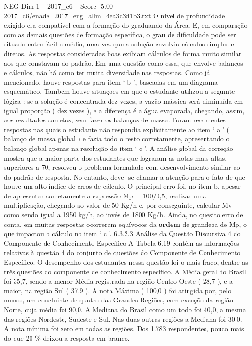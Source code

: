\begin{textsample}{NEG Dim 1 – 2017\_c6 – Score -5.00 – 2017\_c6/enade\_2017\_eng\_alim\_4ea3c3d1b3.txt}
O nível de profundidade exigido era compatível com a formação do graduando da Área.
E, em comparação com as demais questões de formação específica, o grau de dificuldade pode ser situado entre fácil e médio, uma vez que a solução envolvia cálculos simples e diretos.
As respostas consideradas boas exibiam cálculos de forma muito similar aos que constavam do padrão.
Em uma questão como essa, que envolve balanços e cálculos, não há como ter muita diversidade nas respostas.
Como já mencionado, houve respostas para item ‘ b ’, baseadas em um diagrama esquemático.
Também houve situações em que o estudante utilizou a seguinte lógica : se a solução é concentrada dez vezes, a vazão mássica será diminuída em igual proporção ( dez vezes ), e a diferença é a água evaporada, chegando, assim, aos resultados corretos, sem fazer os balanços de massa.
Foram recorrentes respostas nas quais o estudante não respondia explicitamente ao item ‘ a ’ ( balanço de massa global ) e fazia todo o resto corretamente, apresentando o balanço global apenas na resolução do item ‘ c ’.
A análise global da correção mostra que a maior parte dos estudantes que lograram as notas mais altas, superiores a 70, resolveu o problema formulado com desenvolvimento similar ao do padrão de resposta.
No entanto, deve -se chamar a atenção para o fato de que houve um alto índice de erros de cálculo.
O principal erro foi, no item b, apesar de apresentar corretamente a expressão Mp = 100/0,5, realizar uma multiplicação, chegando ao valor de 50 Kg/h e, por conseguinte, calcular Mv como sendo igual a 1950 kg/h, ao invés de 1800 Kg/h.
Ainda, no quesito erro de conta, em muitas respostas ocorreram equívocos da \textbf{ordem} de grandeza de Mp, o que impactou o cálculo no item ‘ c ’. 6.3.2.3 Análise da Questão Discursiva 4 do Componente de Conhecimento Específico A Tabela 6.19 contém as informações relativas à questão 4 do conjunto de questões do Componente de Conhecimento Específico.
O desempenho dos estudantes nessa questão foi o mais fraco, dentre as três questões do componente de conhecimento específico.
A Média geral do Brasil foi 35,7, sendo a menor Média registrada na região Centro-Oeste ( 28,7 ), e a maior, na região Sul ( 37,9 ).
A nota Máxima ( 100,0 ) foi atingida por, pelo menos, um concluinte de quatro das Grandes Regiões, com exceção da região Norte, cuja média foi 90,0.
A Mediana do Brasil como um todo foi 40,0, a mesma das regiões Nordeste, Sudeste e Sul.
Nas duas outras regiões a Mediana foi 30,0.
A nota mínima foi zero em todas as regiões.
Dos 1.783 respondentes, pouco mais do que 20 \% deixou a resposta em branco.

\end{textsample}
